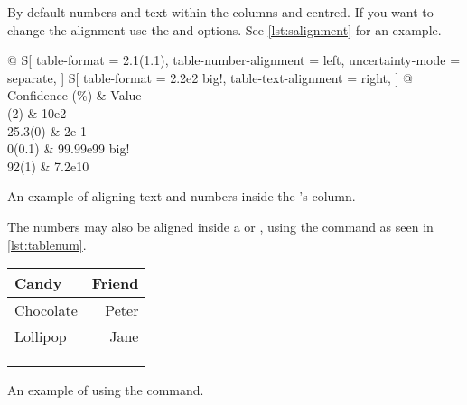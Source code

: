 By default numbers and text within the  columns and centred. If you
want to change the alignment use the  and
 options. See \autoref{lst:salignment} for an example.
\begin{listing}
  \begin{example}[examplewidth=0.7\linewidth, vertical_mode]
\begin{tabular} {
    @{}
    S[
      table-format = 2.1(1.1),
      table-number-alignment = left,
      uncertainty-mode = separate,
    ]
    S[
      table-format = 2.2e2{ big!},
      table-text-alignment = right,
    ]
    @{}
  }
  \toprule
  {Confidence (\unit{\percent})}
    & {Value} \\
  (2) & 10e2 \\
  25.3(0) & 2e-1 \\
  0(0.1)  & 99.99e99{ big!} \\
  92(1)      & 7.2e10 \\
  \bottomrule
\end{tabular}
\end{example}
  \caption{An example of aligning text and numbers inside the 's  column.}\label{lst:salignment}
\end{listing}
The numbers may also be aligned inside a  or ,
using the  command as seen in \autoref{lst:tablenum}.
\begin{listing}
  \begin{example}[examplewidth=0.75\linewidth, vertical_mode]
\begin{tabular}{@{}lr@{}}
  \toprule
  Candy     & Friend                         \\
  \midrule
  Chocolate & Peter                          \\
  Lollipop  & Jane                           \\
  \multicolumn{2}{c}{\tablenum{12,34 e0}}    \\
  \multicolumn{2}{c}{\tablenum{333.5567 e1}} \\
  \multicolumn{2}{c}{\tablenum{4563.21 e2}}  \\
  \bottomrule
\end{tabular}
\end{example}
  \caption{An example of using the  command.}\label{lst:tablenum}
\end{listing}

